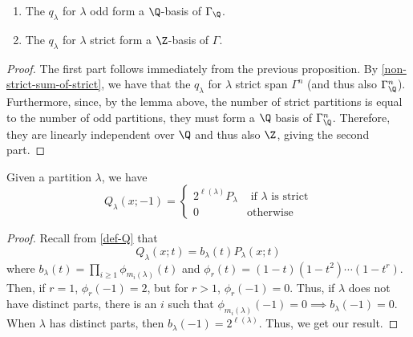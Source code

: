 \documentclass[11pt,leqno,oneside]{amsart}
\numberwithin{thm}{section}
\begin{document}
\begin{prop}
  \begin{enumerate}
  \item The \(q_\lambda\) for \(\lambda\) odd form a \(\Q\)-basis of
    \(\Gamma_\Q\).
  \item The \(q_\lambda\) for \(\lambda\) strict form a \(\Z\)-basis
    of \(\Gamma\).
  \end{enumerate}
\end{prop}
\begin{proof}
  The first part follows immediately from the previous proposition. By
  \ref{non-strict-sum-of-strict}, we have that the \(q_\lambda\) for
  \(\lambda\) strict span \(\Gamma^n\) (and thus also
  \(\Gamma^n_\Q\)). Furthermore, since, by the lemma above, the number
  of strict partitions is equal to the number of odd partitions, they
  must form a \(\Q\) basis of \(\Gamma^n_\Q\). Therefore, they are
  linearly independent over \(\Q\) and thus also \(\Z\), giving the
  second part.
\end{proof}
\begin{prop}
  Given a partition \(\lambda\), we have \[
    Q_\lambda(x;-1) =
    \begin{cases}
      2^{\ell(\lambda)} P_\lambda & \text{ if }\lambda\text{ is
        strict}\\
      0 & \text{otherwise}
    \end{cases}
  \]
\end{prop}
\begin{proof}
  Recall from \ref{def-Q} that \[
    Q_\lambda(x;t) = b_\lambda(t)P_\lambda(x;t)
  \]
  where \(b_\lambda(t) = \prod_{i \geq 1} \phi_{m_i(\lambda)}(t)\) and
  \(\phi_r(t) = (1-t)(1-t^2)\cdots(1-t^r)\). Then, if \(r = 1\),
  \(\phi_r(-1) = 2\), but for \(r > 1\), \(\phi_r(-1)=0\). Thus, if
  \(\lambda\) does not have distinct parts, there is an \(i\) such
  that \(\phi_{m_i(\lambda)}(-1) = 0 \implies b_\lambda(-1) =
  0\). When \(\lambda\) has distinct parts, then \(b_\lambda(-1) =
  2^{\ell(\lambda)}\). Thus, we get our result.
\end{proof}
\end{document}

